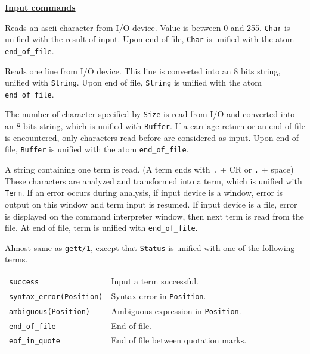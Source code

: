 \noindent\underline{\bf Input commands}\vspace{1ex}\par
{}
\begin{itemize}

Reads an ascii character from I/O device. Value is between 0 and 255.
\verb|Char| is unified with the result of input.
Upon end of file, \verb|Char| is unified with the atom \verb|end_of_file|.

Reads one line from I/O device. This line is converted into an 8 bits string,
unified with \verb|String|. 
Upon end of file, \verb|String| is unified with the atom \verb|end_of_file|.

The number of character specified by \verb|Size| is read from I/O
and converted into an 8 bits string, which is unified with \verb|Buffer|.
If a carriage return or an end of file is encountered,
only characters read before are considered as input.
Upon end of file, \verb|Buffer| is unified  with the atom \verb|end_of_file|.

A string containing one term is read. (A term ends with \verb|.| + CR or 
\verb|.| + space) These characters are analyzed and transformed into a term,
which is unified with \verb|Term|. If an error occurs during analysis,
if input device is a window, error is output on this window
and term input is resumed. If input device is a file,
error is displayed on the command interpreter window,
then next term is read from the file. At end of file, term is unified with
\verb|end_of_file|.

Almost same as \verb|gett/1|,
except that \verb|Status| is unified with one of the following terms.
\vspace{1ex}

\hspace*{15mm}\begin{tabular}{l@{ $\cdots$ }l}
\verb|success|                & Input a term successful.\\
\verb|syntax_error(Position)| & Syntax error in \verb|Position|.\\
\verb|ambiguous(Position)|    & Ambiguous expression in \verb|Position|.\\
\verb|end_of_file|            & End of file.\\
\verb|eof_in_quote|           & End of file between quotation marks.\\
\end{tabular}


\end{itemize}
